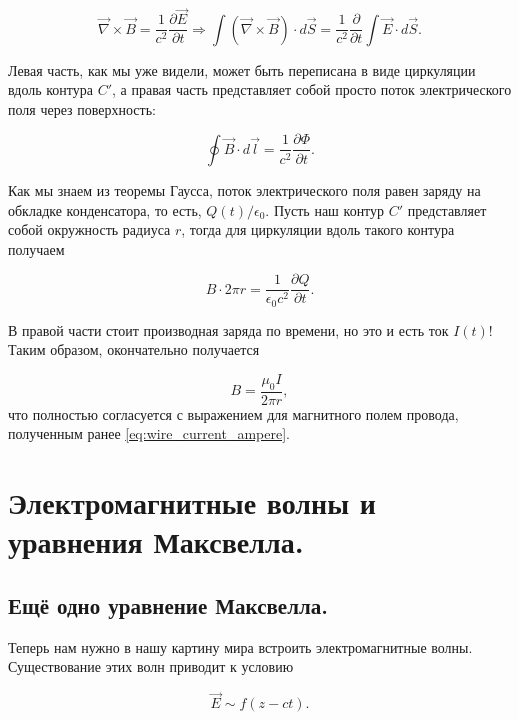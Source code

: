 \documentclass[a4paper,12pt]{article}
\newcommand{\pt}{\partial}
\newcommand{\eps}{\epsilon}
\newcommand{\vn}{\vec{\nabla}}
\begin{document}
\begin{equation}
  \label{eq:displacement_cur_1}
  \vn \times \vec{B} = \frac{1}{c^2} \frac{\pt \vec{E}}{\pt t}
  \Rightarrow \int \left( \vn \times \vec{B}  \right)  \cdot d \vec{S}
  = \frac{1}{c^2} \frac{\pt}{\pt t} \int \vec{E} \cdot d \vec{S}.
\end{equation}

Левая часть, как мы уже видели, может быть переписана в виде
циркуляции вдоль контура $C'$, а правая часть представляет собой
просто поток электрического поля через поверхность: 

\begin{equation}
  \label{eq:displacement_cur_2}
  \oint \vec{B} \cdot d \vec{l} = \frac{1}{c^2} \frac{\pt \Phi}{\pt t}.
\end{equation}

Как мы знаем из теоремы Гаусса, поток электрического поля равен заряду
на обкладке конденсатора, то есть, $Q(t)/\eps_0$. Пусть наш контур
$C'$ представляет собой окружность радиуса $r$, тогда для циркуляции
вдоль такого контура получаем

\begin{equation}
  \label{eq:displacement_cur_3}
  B \cdot 2 \pi r = \frac{1}{\eps_0c^2} \frac{\pt Q}{\pt t}. 
\end{equation}

В правой части стоит производная заряда по времени, но это и есть ток
$I(t)$! Таким образом, окончательно получается

\begin{equation}
  \label{eq:displacement_cur_4}
  B = \frac{\mu_0 I }{2\pi r},
\end{equation}
что полностью согласуется с выражением для магнитного полем провода,
полученным ранее \eqref{eq:wire_current_ampere}.

\section{Электромагнитные волны  и уравнения Максвелла. }
\label{sec:em_waves}

\subsection{Ещё одно уравнение Максвелла.}
\label{sec:maxwell_eq_4}

Теперь нам нужно в нашу картину мира встроить электромагнитные
волны. Существование этих волн приводит к условию

\begin{equation}
  \label{eq:waves_z_dir}
  \vec{E} \sim f (z-ct).
\end{equation}
\end{document}
